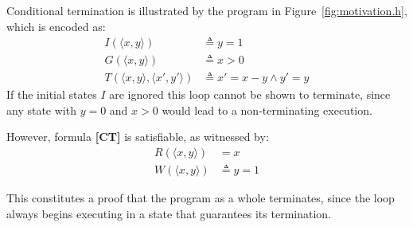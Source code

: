 \documentclass[preprint]{sigplanconf}
\theoremstyle{definition}
\begin{document}
Conditional termination is illustrated by the program in Figure~\ref{fig:motivation.h},
which is encoded as:
\begin{align*}
            I(\langle x, y \rangle) & \triangleq y = 1 \\
            G(\langle x, y \rangle) & \triangleq x > 0 \\
            T(\langle x, y \rangle, \langle x', y' \rangle) & \triangleq x' = x - y \wedge y' = y 
\end{align*}
If the initial states $I$ are ignored this loop cannot be shown to terminate, since any state with $y = 0$ and $x > 0$
would lead to a non-terminating execution.

However, formula {\bf [CT]} is satisfiable, as witnessed by:
\begin{align*}
R(\langle x,y\rangle) & = x\\
W(\langle x, y \rangle ) & \triangleq y  = 1
\end{align*}


This constitutes a proof that the program as a whole terminates, since the loop always begins
executing in a state that guarantees its termination.\\





\end{document}
